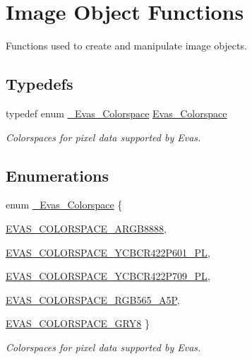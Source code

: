\section{Image Object Functions}
\label{group__Evas__Object__Image}


Functions used to create and manipulate image objects.  


\subsection*{Typedefs}
\begin{DoxyCompactItemize}
\item 
typedef enum \hyperlink{group__Evas__Object__Image_ga84ff1db3d33d85c86d81dbe9046b54bb}{\_\-Evas\_\-Colorspace} \hyperlink{group__Evas__Object__Image_ga8c6e60db9c8b83b155ccea52957ff656}{Evas\_\-Colorspace}
\begin{DoxyCompactList}\small\item\em Colorspaces for pixel data supported by Evas. \item\end{DoxyCompactList}\end{DoxyCompactItemize}
\subsection*{Enumerations}
\begin{DoxyCompactItemize}
\item 
enum \hyperlink{group__Evas__Object__Image_ga84ff1db3d33d85c86d81dbe9046b54bb}{\_\-Evas\_\-Colorspace} \{ \par
\hyperlink{group__Evas__Object__Image_gga84ff1db3d33d85c86d81dbe9046b54bba0948ad4d06f0f64f757aa673d47ac254}{EVAS\_\-COLORSPACE\_\-ARGB8888}, 
\par
\hyperlink{group__Evas__Object__Image_gga84ff1db3d33d85c86d81dbe9046b54bba5e861cf48ce8169485bb334c31678636}{EVAS\_\-COLORSPACE\_\-YCBCR422P601\_\-PL}, 
\par
\hyperlink{group__Evas__Object__Image_gga84ff1db3d33d85c86d81dbe9046b54bba77eda7660a21d397912e0d6084300f22}{EVAS\_\-COLORSPACE\_\-YCBCR422P709\_\-PL}, 
\par
\hyperlink{group__Evas__Object__Image_gga84ff1db3d33d85c86d81dbe9046b54bba69c6f59ef385ef3443caa30ce009f729}{EVAS\_\-COLORSPACE\_\-RGB565\_\-A5P}, 
\par
\hyperlink{group__Evas__Object__Image_gga84ff1db3d33d85c86d81dbe9046b54bba6d0303ab6ba63b8bf89e16d39105e0f0}{EVAS\_\-COLORSPACE\_\-GRY8}
 \}
\begin{DoxyCompactList}\small\item\em Colorspaces for pixel data supported by Evas. \item\end{DoxyCompactList}\end{DoxyCompactItemize}
